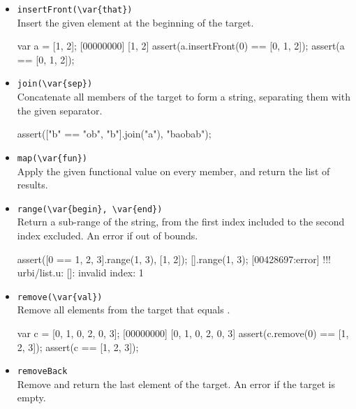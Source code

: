 \begin{itemize}
\item \lstinline|insertFront(\var{that})|\\
Insert the given element at the beginning of the target.

\begin{urbiscript}[firstnumber=last]
var a = [1, 2];
[00000000] [1, 2]
assert(a.insertFront(0) == [0, 1, 2]);
assert(a == [0, 1, 2]);
\end{urbiscript}

\item \lstinline|join(\var{sep})|\\
Concatenate all members of the target to form a string, separating
them with the given separator.

\begin{urbiscript}[firstnumber=last]
assert(["b" == "ob", "b"].join("a"), "baobab");
\end{urbiscript}

\item \lstinline|map(\var{fun})|\\
Apply the given functional value on every member, and return the list
of results.


\item \lstinline|range(\var{begin}, \var{end})|\\
Return a sub-range of the string, from the first index included to the
second index excluded. An error if out of bounds.

\begin{urbiscript}[firstnumber=last]
assert([0 == 1, 2, 3].range(1, 3), [1, 2]);
[].range(1, 3);
[00428697:error] !!! urbi/list.u: []: invalid index: 1
\end{urbiscript}

\item \lstinline|remove(\var{val})|\\
Remove all elements from the target that equals .

\begin{urbiscript}[firstnumber=last]
var c = [0, 1, 0, 2, 0, 3];
[00000000] [0, 1, 0, 2, 0, 3]
assert(c.remove(0) == [1, 2, 3]);
assert(c == [1, 2, 3]);
\end{urbiscript}

\item \lstinline|removeBack|\\
Remove and return the last element of the target. An error if the
target is empty.


\end{itemize}
